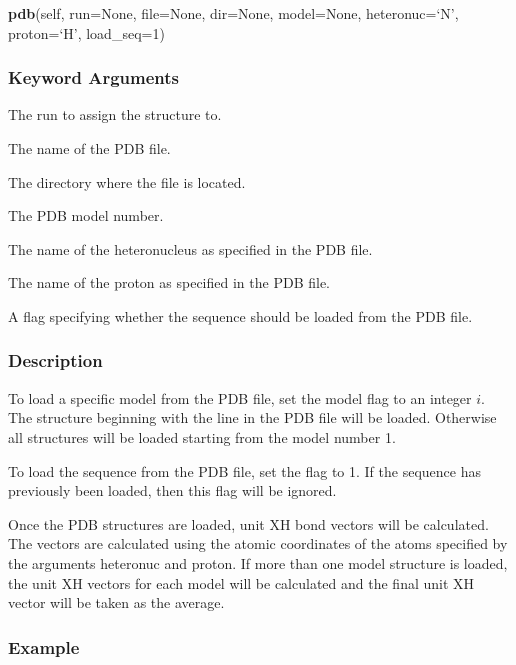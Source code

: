 \textsf{\textbf{pdb}(self, run=None, file=None, dir=None, model=None, heteronuc=`N', proton=`H', load\_seq=1)}


\subsubsection{Keyword Arguments}


  The run to assign the structure to.

  The name of the PDB  file.

  The directory where the file is located.

  The PDB  model number.

  The name of the heteronucleus as specified in the PDB  file.

  The name of the proton as specified in the PDB  file.

  A flag specifying whether the sequence  should be loaded from the PDB  file.

\subsubsection{Description}

To load a specific model from the PDB  file, set the model flag to an integer $i$.  The
structure beginning with the line 
 in the PDB  file will be loaded.  Otherwise all
structures will be loaded starting from the model number 1.

To load the sequence  from the PDB  file, set the 
 flag to 1.  If the sequence  has
previously been loaded, then this flag will be ignored.

Once the PDB  structures are loaded, unit XH bond vectors will be calculated.  The vectors
are calculated using the atomic coordinates of the atoms specified by the arguments
heteronuc and proton.  If more than one model structure is loaded, the unit XH vectors for
each model will be calculated and the final unit XH vector will be taken as the average.


\subsubsection{Example}

